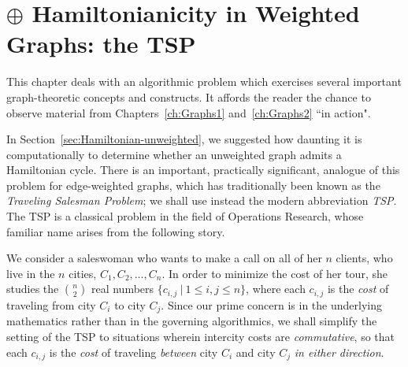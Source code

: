 \chapter{$\oplus$ Hamiltonianicity in Weighted Graphs: the TSP}
\label{sec:TSP}

This chapter deals with an algorithmic problem which exercises several important graph-theoretic concepts and constructs.  It affords the reader the chance to observe material from Chapters~\ref{ch:Graphs1} and~\ref{ch:Graphs2} ``in action".

\medskip

In Section~\ref{sec:Hamiltonian-unweighted}, we suggested how daunting it is computationally to determine whether an unweighted graph admits a Hamiltonian cycle.  There is an important, practically significant, analogue of this problem for edge-weighted graphs, which has traditionally been known as the {\it Traveling Salesman Problem}; we shall use instead the modern abbreviation {\it TSP}.  The TSP is a classical problem in the field of Operations Research, whose familiar name arises from the following story.


\smallskip

We consider a saleswoman who wants to make a call on all of her $n$ clients, who live in the $n$ cities, $C_1, C_2, \ldots, C_n$.  In order to minimize the cost of her tour, she studies the
$\displaystyle {n \choose 2}$ real numbers $\{c_{i,j} \ | \ 1 \leq i,j \leq n\}$, where each $c_{i,j}$ is the {\it cost} of traveling from city $C_i$ to city $C_j$.  Since our prime concern is in the underlying mathematics rather than in the governing algorithmics, we shall simplify the setting of the TSP to situations wherein intercity costs are {\em commutative}, so that each  $c_{i,j}$ is the {\it cost} of traveling {\em between} city $C_i$ and city $C_j$ {\em in either direction}.

\bigskip

